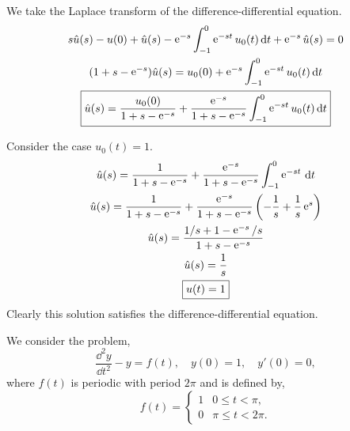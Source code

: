 {\begin{Solution}
  We take the Laplace transform of the difference-differential equation.
  \begin{gather*}
    s \hat{u}(s) - u(0) + \hat{u}(s) - \mathop{\mathrm{e}}\nolimits^{-s} \int_{-1}^0 \mathop{\mathrm{e}}\nolimits^{-s t} u_0(t) \,\mathrm{d} t
    + \mathop{\mathrm{e}}\nolimits^{-s} \hat{u}(s) = 0 \\
    (1 + s - \mathop{\mathrm{e}}\nolimits^{-s} ) \hat{u}(s) = u_0(0) + \mathop{\mathrm{e}}\nolimits^{-s} \int_{-1}^0 \mathop{\mathrm{e}}\nolimits^{-s t} u_0(t) \,\mathrm{d} t \\
    \boxed{
      \hat{u}(s) = \frac{ u_0(0) }{ 1 + s - \mathop{\mathrm{e}}\nolimits^{-s} } 
      + \frac{ \mathop{\mathrm{e}}\nolimits^{-s} }{ 1 + s - \mathop{\mathrm{e}}\nolimits^{-s} } \int_{-1}^0 \mathop{\mathrm{e}}\nolimits^{-s t} u_0(t) \,\mathrm{d} t
      }
  \end{gather*}

  Consider the case  $u_0(t) = 1$.
  \begin{gather*}
    \hat{u}(s) = \frac{ 1 }{ 1 + s - \mathop{\mathrm{e}}\nolimits^{-s} } 
    + \frac{ \mathop{\mathrm{e}}\nolimits^{-s} }{ 1 + s - \mathop{\mathrm{e}}\nolimits^{-s} } \int_{-1}^0 \mathop{\mathrm{e}}\nolimits^{-s t} \,\mathrm{d} t \\
    \hat{u}(s) = \frac{ 1 }{ 1 + s - \mathop{\mathrm{e}}\nolimits^{-s} } + \frac{ \mathop{\mathrm{e}}\nolimits^{-s} }{ 1 + s - \mathop{\mathrm{e}}\nolimits^{-s} } 
    \left( - \frac{1}{s} + \frac{1}{s} \mathop{\mathrm{e}}\nolimits^s \right) \\
    \hat{u}(s) = \frac{ 1/s + 1 - \mathop{\mathrm{e}}\nolimits^{-s} / s }{ 1 + s - \mathop{\mathrm{e}}\nolimits^{-s} } \\
    \hat{u}(s) = \frac{1}{s} \\
    \boxed{
      u(t) = 1
      }
  \end{gather*}
  Clearly this solution satisfies the difference-differential equation.
\end{Solution}







\begin{Solution}
  \label{solution f(t)=1,0<t<pi}
  We consider the problem,
  \[
  \frac{\dd^2 y}{\dd t^2} - y = f(t), \quad y(0) = 1, \quad y'(0) = 0,
  \]
  where $f(t)$ is periodic with period $2 \pi$ and is defined by,
  \[
  f(t) = 
  \begin{cases}
    1 & 0 \leq t < \pi, \\
    0 & \pi \leq t < 2\pi.
  \end{cases}
  \]


\end{Solution}}
